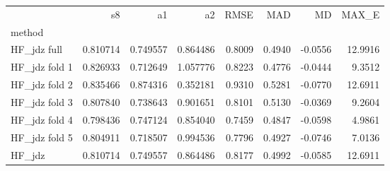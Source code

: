 \begin{tabular}{lrrrrrrr}
 & s8 & a1 & a2 & RMSE & MAD & MD & MAX_E \\
method &  &  &  &  &  &  &  \\
HF_jdz full & 0.810714 & 0.749557 & 0.864486 & 0.8009 & 0.4940 & -0.0556 & 12.9916 \\
HF_jdz fold 1 & 0.826933 & 0.712649 & 1.057776 & 0.8223 & 0.4776 & -0.0444 & 9.3512 \\
HF_jdz fold 2 & 0.835466 & 0.874316 & 0.352181 & 0.9310 & 0.5281 & -0.0770 & 12.6911 \\
HF_jdz fold 3 & 0.807840 & 0.738643 & 0.901651 & 0.8101 & 0.5130 & -0.0369 & 9.2604 \\
HF_jdz fold 4 & 0.798436 & 0.747124 & 0.854040 & 0.7459 & 0.4847 & -0.0598 & 4.9861 \\
HF_jdz fold 5 & 0.804911 & 0.718507 & 0.994536 & 0.7796 & 0.4927 & -0.0746 & 7.0136 \\
HF_jdz & 0.810714 & 0.749557 & 0.864486 & 0.8177 & 0.4992 & -0.0585 & 12.6911 \\
\end{tabular}
